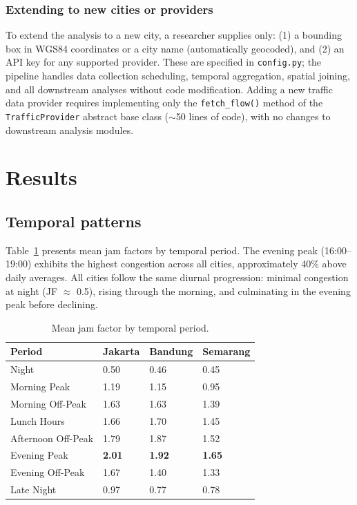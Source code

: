 \documentclass[preprint,12pt,authoryear]{elsarticle}
\begin{document}
\subsubsection{Extending to new cities or providers}

To extend the analysis to a new city, a researcher supplies only: (1) a bounding box in WGS84 coordinates or a city name (automatically geocoded), and (2) an API key for any supported provider. These are specified in \texttt{config.py}; the pipeline handles data collection scheduling, temporal aggregation, spatial joining, and all downstream analyses without code modification. Adding a new traffic data provider requires implementing only the \texttt{fetch\_flow()} method of the \texttt{TrafficProvider} abstract base class ($\sim$50 lines of code), with no changes to downstream analysis modules.


\section{Results}
\label{sec:results}

\subsection{Temporal patterns}

Table~\ref{tab:temporal} presents mean jam factors by temporal period. The evening peak (16:00--19:00) exhibits the highest congestion across all cities, approximately 40\% above daily averages. All cities follow the same diurnal progression: minimal congestion at night (JF $\approx$ 0.5), rising through the morning, and culminating in the evening peak before declining.

\begin{table}[htbp]
\centering
\caption{Mean jam factor by temporal period.}
\label{tab:temporal}
\begin{tabular}{llll}
\toprule
Period & Jakarta & Bandung & Semarang \\
\midrule
Night              & 0.50 & 0.46 & 0.45 \\
Morning Peak       & 1.19 & 1.15 & 0.95 \\
Morning Off-Peak   & 1.63 & 1.63 & 1.39 \\
Lunch Hours        & 1.66 & 1.70 & 1.45 \\
Afternoon Off-Peak & 1.79 & 1.87 & 1.52 \\
Evening Peak       & \textbf{2.01} & \textbf{1.92} & \textbf{1.65} \\
Evening Off-Peak   & 1.67 & 1.40 & 1.33 \\
Late Night         & 0.97 & 0.77 & 0.78 \\
\bottomrule
\end{tabular}
\end{table}
\end{document}
